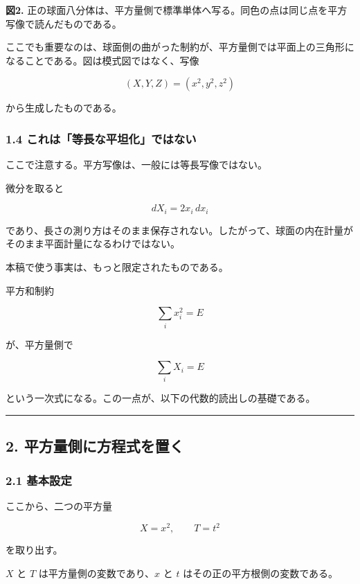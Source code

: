 \documentclass[
]{ltjsarticle}
\begin{document}
\textbf{図2.}
正の球面八分体は、平方量側で標準単体へ写る。同色の点は同じ点を平方写像で読んだものである。

ここでも重要なのは、球面側の曲がった制約が、平方量側では平面上の三角形になることである。図は模式図ではなく、写像

\[
(X,Y,Z)=(x^2,y^2,z^2)
\]

から生成したものである。

\subsubsection{1.4
これは「等長な平坦化」ではない}\label{ux3053ux308cux306fux7b49ux9577ux306aux5e73ux5766ux5316ux3067ux306fux306aux3044}

ここで注意する。平方写像は、一般には等長写像ではない。

微分を取ると

\[
dX_i=2x_i\,dx_i
\]

であり、長さの測り方はそのまま保存されない。したがって、球面の内在計量がそのまま平面計量になるわけではない。

本稿で使う事実は、もっと限定されたものである。

平方和制約

\[
\sum_i x_i^2=E
\]

が、平方量側で

\[
\sum_i X_i=E
\]

という一次式になる。この一点が、以下の代数的読出しの基礎である。

\begin{center}\rule{0.5\linewidth}{0.5pt}\end{center}

\subsection{2.
平方量側に方程式を置く}\label{ux5e73ux65b9ux91cfux5074ux306bux65b9ux7a0bux5f0fux3092ux7f6eux304f}

\subsubsection{2.1 基本設定}\label{ux57faux672cux8a2dux5b9a}

ここから、二つの平方量

\[
X=x^2,\qquad T=t^2
\]

を取り出す。

\(X\) と \(T\) は平方量側の変数であり、\(x\) と \(t\)
はその正の平方根側の変数である。
\end{document}
